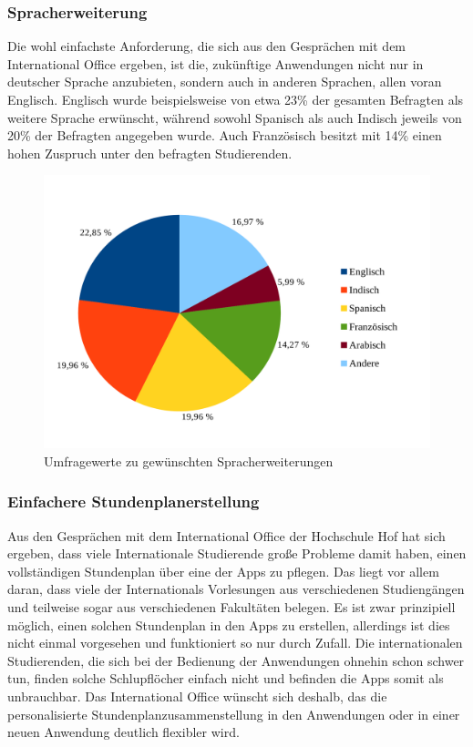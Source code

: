\subsubsection{Spracherweiterung}

Die wohl einfachste Anforderung, die sich aus den Gesprächen mit dem International Office ergeben, ist die, zukünftige Anwendungen nicht nur in deutscher Sprache anzubieten, sondern auch in anderen Sprachen, allen voran Englisch. Englisch wurde beispielsweise von etwa 23\% der gesamten Befragten als weitere Sprache erwünscht, während sowohl Spanisch als auch Indisch jeweils von 20\% der Befragten angegeben wurde. Auch Französisch besitzt mit 14\% einen hohen Zuspruch unter den befragten Studierenden. 

\begin{figure}[h]
	\begin{center}
		\includegraphics[width=12cm]{Bilder/Umfrage/Umfrage_Sprachen.pdf}
		\caption{Umfragewerte zu gewünschten Spracherweiterungen\label{fig:umfrage_sprachen_diagram}\protect\footnotemark}
	\end{center}
\end{figure}

\subsubsection{Einfachere Stundenplanerstellung}



Aus den Gesprächen mit dem International Office der Hochschule Hof hat sich ergeben, dass viele Internationale Studierende große Probleme damit haben, einen vollständigen Stundenplan über eine der \acp{App} zu pflegen. Das liegt vor allem daran, dass viele der Internationals Vorlesungen aus verschiedenen Studiengängen und teilweise sogar aus verschiedenen Fakultäten belegen. Es ist zwar prinzipiell möglich, einen solchen Stundenplan in den \acp{App} zu erstellen, allerdings ist dies nicht einmal vorgesehen und funktioniert so nur durch Zufall. Die internationalen Studierenden, die sich bei der Bedienung der Anwendungen ohnehin schon schwer tun, finden solche Schlupflöcher einfach nicht und befinden die \acp{App} somit als unbrauchbar. Das International Office wünscht sich deshalb, das die personalisierte Stundenplanzusammenstellung in den Anwendungen oder in einer neuen Anwendung deutlich flexibler wird.  

